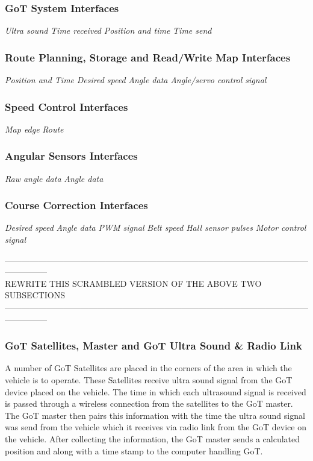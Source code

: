 \subsubsection{GoT System Interfaces}
\textit{Ultra sound} \textit{Time received} \textit{Position and time} \textit{Time send}

\subsubsection{Route Planning, Storage and Read/Write Map Interfaces}
\textit{Position and Time} \textit{Desired speed} \textit{Angle data} \textit{Angle/servo control signal}

\subsubsection{Speed Control Interfaces}
\textit{Map edge} \textit{Route}

\subsubsection{Angular Sensors Interfaces}
\textit{Raw angle data} \textit{Angle data}

\subsubsection{Course Correction Interfaces}
\textit{Desired speed} \textit{Angle data} \textit{PWM signal} \textit{Belt speed} \textit{Hall sensor pulses} \textit{Motor control signal}

---------------------------------------------------------------------------------------------------------------------------\\
REWRITE THIS SCRAMBLED VERSION OF THE ABOVE TWO SUBSECTIONS\\
---------------------------------------------------------------------------------------------------------------------------

\subsubsection{GoT Satellites, Master and GoT Ultra Sound \& Radio Link}
A number of GoT Satellites are placed in the corners of the area in which the vehicle is to operate. These Satellites receive ultra sound signal from the GoT device placed on the vehicle. The time in which each ultrasound signal is received is passed through a wireless connection from the satellites to the GoT master. The GoT master then pairs this information with the time the ultra sound signal was send from the vehicle which it receives via radio link from the GoT device on the vehicle. After collecting the information, the GoT master sends a calculated position and along with a time stamp to the computer handling GoT.

